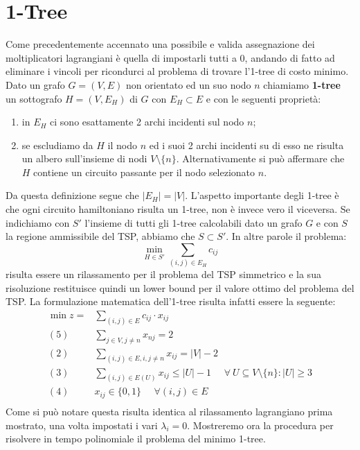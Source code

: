 \documentclass[
	article,			%
	12pt,				%
	oneside,			%
	a4paper,			%
	english,			%
	italian,				%
	sumario=tradicional,
	]{abntex2}
\begin{document}
\section{1-Tree}
Come precedentemente accennato una possibile e valida assegnazione dei moltiplicatori lagrangiani è quella di impostarli tutti a 0, andando di fatto ad eliminare i vincoli per ricondurci al problema di trovare l'1-tree di costo minimo.
\newline
Dato un grafo $G=(V,E)$ non orientato ed un suo nodo $n$ chiamiamo \textbf{1-tree} un sottografo $H = (V, E_H)$ di $G$ con $E_H \subset E$ e con le seguenti proprietà:
\begin{enumerate}
    \item in $E_H$ ci sono esattamente 2 archi incidenti sul nodo $n$;
    \item se escludiamo da $H$ il nodo $n$ ed i suoi 2 archi incidenti su di esso ne risulta un albero sull'insieme di nodi $V \setminus \{n\}$. Alternativamente si può affermare che $H$ contiene un circuito passante per il nodo selezionato $n$.
\end{enumerate}
Da questa definizione segue che $|E_H| = |V|$.
\newline
L'aspetto importante degli 1-tree è che ogni circuito hamiltoniano risulta un 1-tree, non è invece vero il viceversa. Se indichiamo con $S'$ l'insieme di tutti gli 1-tree calcolabili dato un grafo $G$ e con $S$ la regione ammissibile del TSP, abbiamo che $S \subset S'$.
In altre parole il problema:
\begin{equation*}
    \min_{H\in S'} \sum_{(i,j) \in E_H} c_{ij}
\end{equation*}
risulta essere un rilassamento per il problema del TSP simmetrico e la sua risoluzione restituisce quindi un lower bound per il valore ottimo del problema del TSP.
\newline
La formulazione matematica dell'1-tree risulta infatti essere la seguente:
\begin{equation*}
    \begin{split}
        \min z = & \sum_{(i,j) \in E} c_{ij} \cdot x_{ij}\\
        (5)\:\:\:\:\:\: & \sum_{j \in V, j \neq n} x_{nj} = 2 \\
        (2) \:\:\:\:\:\: & \sum_{(i,j)\in E, i, j \neq n} x_{ij} = |V|-2 \\
        (3) \:\:\:\:\:\: & \sum_{(i,j) \in E(U)} x_{ij} \leq |U| - 1 \:\:\:\:\:\: \forall\: U \subseteq V\setminus\{n\} : |U| \geq 3 \\
        (4) \:\:\:\:\:\: & x_{ij} \in \{0,1\} \:\:\:\:\:\: \forall (i,j) \in E\\
    \end{split}
\end{equation*}
Come si può notare questa risulta identica al rilassamento lagrangiano prima mostrato, una volta impostati i vari $\lambda_i = 0$.
\newline
Mostreremo ora la procedura per risolvere in tempo polinomiale il problema del minimo 1-tree.
\end{document}
